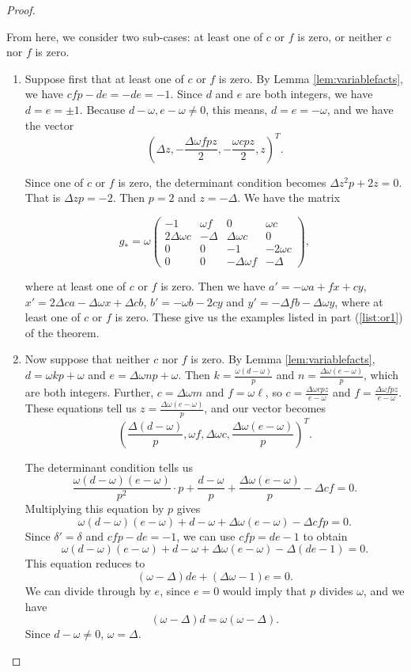 \documentclass{amsart}     %
\theoremstyle{definition}
\begin{document}
\begin{proof}
\begin{enumerate}
From here, we consider two sub-cases:  at least one of $c$ or $f$ is zero, or neither $c$ nor $f$ is zero.

\begin{enumerate}
\item  Suppose first that at least one of $c$ or $f$ is zero. By Lemma \ref{lem:variablefacts}, we have $cfp - de = -de = -1$. Since $d$ and $e$ are both integers, we have $d = e = \pm 1$. Because $d - \omega , e-\omega  \neq 0$, this means, $d = e = -\omega $, and we have the vector $$\left(\Delta  z, -\frac{\Delta \omega  fpz}{2}, -\frac{\omega  cpz}{2}, z\right)^T.$$ 

Since one of $c$ or $f$ is zero, the determinant condition becomes $\Delta z^2 p + 2z = 0$. That is $\Delta z p = -2$. Then $p = 2$ and $z = - \Delta$. We have the matrix

\[g_* = \omega \begin{pmatrix}  -1 & \omega  f & 0 & \omega  c \\
2\Delta \omega  c & -\Delta & \Delta \omega  c & 0 \\ 
0 & 0 & - 1 & -2 \omega  c \\ 
0 & 0 & -\Delta\omega  f & -\Delta \end{pmatrix},\]

where at least one of $c$ or $f$ is zero. 
Then we have $a' = -\omega a +  f x +c y$, $x' = 2\Delta  c a - \Delta \omega x + \Delta c b$, $b' = -  \omega b - 2 c y$ and $y' = -\Delta   f b - \Delta  \omega y$, where at least one of $c$ or $f$ is zero. These give us the examples listed in part (\ref{list:or1}) of the theorem.  



\item Now suppose that neither $c$ nor $f$ is zero. By Lemma \ref{lem:variablefacts}, $d = \omega kp + \omega$ and $e = \Delta \omega np + \omega$. Then $k = \frac{\omega (d-\omega)}{p}$ and $n = \frac{\Delta \omega (e - \omega)}{p}$, which are both integers. Further, $c = \Delta  \omega m$ and $f = \omega  \ell$, so $c = \frac{\Delta \omega  cp z}{e - \omega }$ and $f = \frac{\Delta \omega fpz}{e-\omega }$. These equations tell us $z = \frac{\Delta\omega (e-\omega )}{p}$, and our vector becomes $$\left(\frac{\Delta  (d- \omega  )}{p}, \omega f, \Delta\omega c, \frac{\Delta \omega(e - \omega)}{p}\right)^T.$$

The determinant condition tells us $$\frac{\omega(d-\omega)(e - \omega)}{p^2} \cdot p + \frac{d-\omega}{p} + \frac{\Delta \omega(e-\omega)}{p} -\Delta cf = 0.$$ Multiplying this equation by $p$ gives $$\omega(d-\omega)(e - \omega) + d-\omega+ \Delta \omega(e-\omega)-\Delta cfp = 0.$$ Since $\delta' = \delta$ and $cfp - de = -1$,  we can use $cfp = de -1$ to obtain $$\omega(d-\omega)(e - \omega) + d-\omega+ \Delta \omega(e-\omega)-\Delta (de -1) = 0.$$ This equation reduces to $$(\omega-\Delta ) de   +( \Delta \omega-1) e  = 0.$$
We can divide through by $e$, since $e = 0$ would imply that $p$ divides $\omega$, and we have $$(\omega-\Delta ) d  = \omega(\omega - \Delta).$$
Since $d-\omega \neq 0$, $\omega = \Delta$.



\end{enumerate}
\end{enumerate}
\end{proof}
\end{document}
